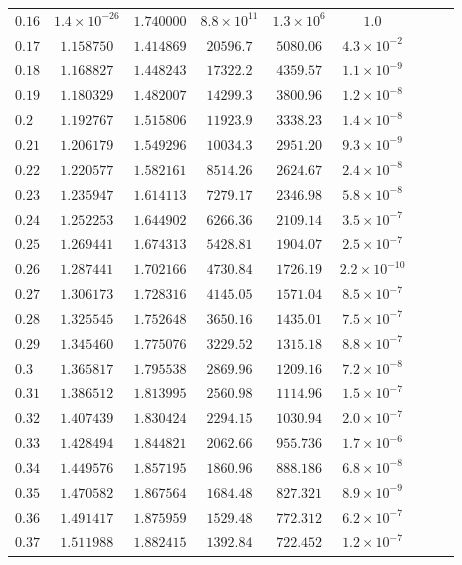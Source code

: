 \documentclass[12pt]{extarticle}
\theoremstyle{plain}
\theoremstyle{remark}
\begin{document}
\begin{longtable}{lcccccccc}
$0.16$ & $1.4\times10^{-26}$ & $1.740000$ & $8.8\times10^{11}$ & $1.3\times10^{6}$ & $1.0$ \\
$0.17$ & $1.158750$ & $1.414869$ & $20596.7$ & $5080.06$ & $4.3\times10^{-2}$ \\
$0.18$ & $1.168827$ & $1.448243$ & $17322.2$ & $4359.57$ & $1.1\times10^{-9}$ \\
$0.19$ & $1.180329$ & $1.482007$ & $14299.3$ & $3800.96$ & $1.2\times10^{-8}$ \\
$0.2$ & $1.192767$ & $1.515806$ & $11923.9$ & $3338.23$ & $1.4\times10^{-8}$ \\
$0.21$ & $1.206179$ & $1.549296$ & $10034.3$ & $2951.20$ & $9.3\times10^{-9}$ \\
$0.22$ & $1.220577$ & $1.582161$ & $8514.26$ & $2624.67$ & $2.4\times10^{-8}$ \\
$0.23$ & $1.235947$ & $1.614113$ & $7279.17$ & $2346.98$ & $5.8\times10^{-8}$ \\
$0.24$ & $1.252253$ & $1.644902$ & $6266.36$ & $2109.14$ & $3.5\times10^{-7}$ \\
$0.25$ & $1.269441$ & $1.674313$ & $5428.81$ & $1904.07$ & $2.5\times10^{-7}$ \\
$0.26$ & $1.287441$ & $1.702166$ & $4730.84$ & $1726.19$ & $2.2\times10^{-10}$ \\
$0.27$ & $1.306173$ & $1.728316$ & $4145.05$ & $1571.04$ & $8.5\times10^{-7}$ \\
$0.28$ & $1.325545$ & $1.752648$ & $3650.16$ & $1435.01$ & $7.5\times10^{-7}$ \\
$0.29$ & $1.345460$ & $1.775076$ & $3229.52$ & $1315.18$ & $8.8\times10^{-7}$ \\
$0.3$ & $1.365817$ & $1.795538$ & $2869.96$ & $1209.16$ & $7.2\times10^{-8}$ \\
$0.31$ & $1.386512$ & $1.813995$ & $2560.98$ & $1114.96$ & $1.5\times10^{-7}$ \\
$0.32$ & $1.407439$ & $1.830424$ & $2294.15$ & $1030.94$ & $2.0\times10^{-7}$ \\
$0.33$ & $1.428494$ & $1.844821$ & $2062.66$ & $955.736$ & $1.7\times10^{-6}$ \\
$0.34$ & $1.449576$ & $1.857195$ & $1860.96$ & $888.186$ & $6.8\times10^{-8}$ \\
$0.35$ & $1.470582$ & $1.867564$ & $1684.48$ & $827.321$ & $8.9\times10^{-9}$ \\
$0.36$ & $1.491417$ & $1.875959$ & $1529.48$ & $772.312$ & $6.2\times10^{-7}$ \\
$0.37$ & $1.511988$ & $1.882415$ & $1392.84$ & $722.452$ & $1.2\times10^{-7}$ \\

\end{longtable}
\end{document}
